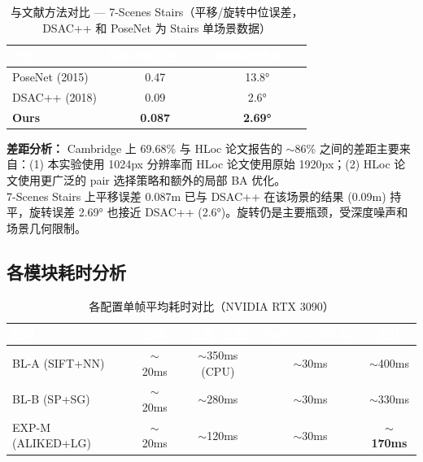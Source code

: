 \documentclass[12pt,a4paper]{ctexart}
\newcommand{\bestval}[1]{\textcolor{best}{\textbf{#1}}}
\begin{document}
\begin{table}[H]
\centering
\caption{与文献方法对比 — 7-Scenes Stairs（平移/旋转中位误差，DSAC++ 和 PoseNet 为 Stairs 单场景数据）}
\label{tab:lit_7s}
\begin{tabular}{@{}lcc@{}}
\toprule
\rowcolor{headbg}
\textcolor{white}{\textbf{方法}} &
\textcolor{white}{\textbf{平移中位误差 (m)}} &
\textcolor{white}{\textbf{旋转中位误差 (°)}} \\
\midrule
PoseNet (2015)    & 0.47  & 13.8° \\
DSAC++ (2018)     & 0.09  & 2.6° \\
\midrule
\textbf{Ours}      & \textbf{0.087} & \textbf{2.69°} \\
\bottomrule
\end{tabular}
\end{table}

\textbf{差距分析：} Cambridge 上 69.68\% 与 HLoc 论文报告的 $\sim$86\% 之间的差距主要来自：(1) 本实验使用 1024px 分辨率而 HLoc 论文使用原始 1920px；(2) HLoc 论文使用更广泛的 pair 选择策略和额外的局部 BA 优化。\\
7-Scenes Stairs 上平移误差 0.087m 已与 DSAC++ 在该场景的结果 (0.09m) 持平，旋转误差 2.69° 也接近 DSAC++ (2.6°)。旋转仍是主要瓶颈，受深度噪声和场景几何限制。

\subsection{各模块耗时分析}

\begin{table}[H]
\centering
\caption{各配置单帧平均耗时对比（NVIDIA RTX 3090）}
\label{tab:timing}
\begin{tabular}{@{}lcccc@{}}
\toprule
\rowcolor{headbg}
\textcolor{white}{\textbf{配置}} &
\textcolor{white}{\textbf{检索}} &
\textcolor{white}{\textbf{检测+匹配}} &
\textcolor{white}{\textbf{PnP+RANSAC}} &
\textcolor{white}{\textbf{总计}} \\
\midrule
BL-A (SIFT+NN)     & $\sim$20ms & $\sim$350ms (CPU) & $\sim$30ms & $\sim$400ms \\
BL-B (SP+SG)       & $\sim$20ms & $\sim$280ms & $\sim$30ms & $\sim$330ms \\
EXP-M (ALIKED+LG)  & $\sim$20ms & $\sim$120ms & $\sim$30ms & \bestval{$\sim$170ms} \\
\bottomrule
\end{tabular}
\end{table}
\end{document}
